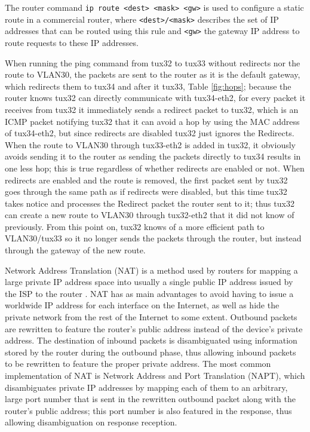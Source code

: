 \documentclass[a4paper, 11pt]{report}
\begin{document}
The router command \texttt{ip route <dest> <mask> <gw>} is used to configure a static route in a commercial router, where \texttt{<dest>/<mask>} describes the set of IP addresses that can be routed using this rule and \texttt{<gw>} the gateway IP address to route requests to these IP addresses.

When running the ping command from tux32 to tux33 without redirects nor the route to VLAN30, the packets are sent to the router as it is the default gateway, which redirects them to tux34 and after it tux33, Table \ref{fig:hops}; because the router knows tux32 can directly communicate with tux34-eth2, for every packet it receives from tux32 it immediately sends a redirect packet to tux32, which is an ICMP packet notifying tux32 that it can avoid a hop by using the MAC address of tux34-eth2, but since redirects are disabled tux32 just ignores the Redirects.
When the route to VLAN30 through tux33-eth2 is added in tux32, it obviously avoids sending it to the router as sending the packets directly to tux34 results in one less hop; this is true regardless of whether redirects are enabled or not.
When redirects are enabled and the route is removed, the first packet sent by tux32 goes through the same path as if redirects were disabled, but this time tux32 takes notice and processes the Redirect packet the router sent to it; thus tux32 can create a new route to VLAN30 through tux32-eth2 that it did not know of previously. From this point on, tux32 knows of a more efficient path to VLAN30/tux33 so it no longer sends the packets through the router, but instead through the gateway of the new route.

Network Address Translation (NAT) is a method used by routers for mapping a large private IP address space into usually a single public IP address issued by the ISP to the router \cite{rfc2663}.
NAT has as main advantages to avoid having to issue a worldwide IP address for each interface on the Internet, as well as hide the private network from the rest of the Internet to some extent.
Outbound packets are rewritten to feature the router's public address instead of the device's private address.
The destination of inbound packets is disambiguated using information stored by the router during the outbound phase, thus allowing inbound packets to be rewritten to feature the proper private address.
The most common implementation of NAT is Network Address and Port Translation (NAPT), which disambiguates private IP addresses by mapping each of them to an arbitrary, large port number that is sent in the rewritten outbound packet along with the router's public address; this port number is also featured in the response, thus allowing disambiguation on response reception.
\end{document}
